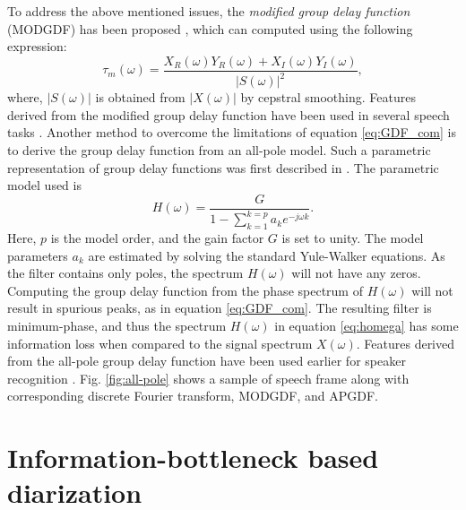 \documentclass[conference]{IEEEtran}
\begin{document}
To address the above mentioned issues, the
\textit{modified group delay function} (MODGDF) has been proposed
\cite{modifiedGD}, which can
computed using the following expression:
\begin{equation}
\tau_{m}(\omega) =  
\frac{X_R(\omega)Y_R(\omega) + X_I(\omega)Y_I(\omega)}{|S(\omega)|^2}, 
\label{eq:MODGDF}
\end{equation}
where, $|S(\omega)|$ is obtained from $|X(\omega)|$ by cepstral smoothing.
Features derived from the modified group delay function have been used in
several speech tasks \cite{modifiedGD}.
Another method to overcome the limitations of equation \ref{eq:GDF_com} is to
derive the group delay function from an all-pole model. Such a parametric
representation of group delay functions was first described in \cite{yegnaJASA}.
The parametric model used is
\begin{equation}
H(\omega) =  \frac{G}{1 - \sum_{k=1}^{k = p} a_k e^{-j\omega k}}.
\label{eq:homega}
\end{equation}
Here, $p$ is the model order, and the gain factor $G$ is set to unity. The model
parameters $a_k$ are estimated by solving the standard Yule-Walker equations. As
the filter contains only poles, the spectrum $H(\omega)$ will not have any
zeros.  Computing the group delay function from the phase spectrum of
$H(\omega)$ will not result in spurious peaks, as in equation \ref{eq:GDF_com}.
The resulting filter is minimum-phase, and thus the spectrum $H(\omega)$ in
equation \ref{eq:homega} has some information loss when compared to the signal
spectrum $X(\omega)$. Features derived from the all-pole group delay function
have been used earlier for speaker recognition \cite{allPoleGdSid}. Fig. \ref{fig:all-pole} 
shows a sample of speech frame along with corresponding discrete Fourier transform, MODGDF, and APGDF. 

\section{Information-bottleneck based diarization}
\label{system}

\end{document}
